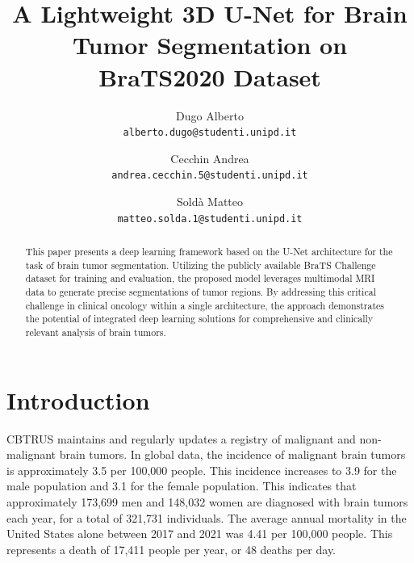 \documentclass[10pt,twocolumn,letterpaper]{article}
\begin{document}
\title{A Lightweight 3D U-Net for Brain Tumor Segmentation on BraTS2020 Dataset}
\author{Dugo Alberto\\
{\tt\scriptsize alberto.dugo@studenti.unipd.it}\\
\and
Cecchin Andrea\\
{\tt\scriptsize andrea.cecchin.5@studenti.unipd.it}\\
\and
Soldà Matteo\\
{\tt\scriptsize matteo.solda.1@studenti.unipd.it}\\
}
\maketitle

\begin{abstract}
    This paper presents a deep learning framework based on the U-Net architecture for the task of brain tumor segmentation. Utilizing the publicly available BraTS Challenge dataset for training and evaluation, the proposed model leverages multimodal MRI data to generate precise segmentations of tumor regions. By addressing this critical challenge in clinical oncology within a single architecture, the approach demonstrates the potential of integrated deep learning solutions for comprehensive and clinically relevant analysis of brain tumors.
\end{abstract}

\section{Introduction}
CBTRUS\cite{CBTRUSTumors2022} maintains and regularly updates a registry of malignant and non-malignant brain tumors.
In global data, the incidence of malignant brain tumors is approximately 3.5 per 100,000 people. This incidence increases to 3.9 for the male population and 3.1 for the female population. This indicates that approximately 173,699 men and 148,032 women are diagnosed with brain tumors each year, for a total of 321,731 individuals. The average annual mortality in the United States alone between 2017 and 2021 was 4.41 per 100,000 people. This represents a death of 17,411 people per year, or 48 deaths per day.
\end{document}
